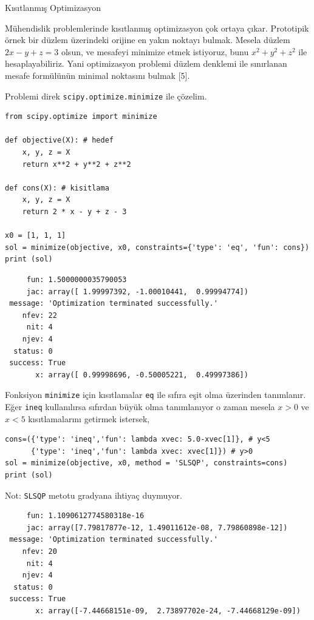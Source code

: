 \documentclass[12pt,fleqn]{article}\usepackage{../../common}
\begin{document}
Kısıtlanmış Optimizasyon

Mühendislik problemlerinde kısıtlanmış optimizasyon çok ortaya
çıkar. Prototipik örnek bir düzlem üzerindeki orijine en yakın noktayı
bulmak. Mesela düzlem $2x - y + z = 3$ olsun, ve mesafeyi minimize etmek
istiyoruz, bunu $x^2+y^2+z^2$ ile hesaplayabiliriz. Yani optimizasyon
problemi düzlem denklemi ile sınırlanan mesafe formülünün minimal noktasını
bulmak [5]. 

Problemi direk \verb!scipy.optimize.minimize! ile çözelim. 

\begin{verbatim}
from scipy.optimize import minimize

def objective(X): # hedef
    x, y, z = X
    return x**2 + y**2 + z**2

def cons(X): # kisitlama
    x, y, z = X
    return 2 * x - y + z - 3

x0 = [1, 1, 1]
sol = minimize(objective, x0, constraints={'type': 'eq', 'fun': cons})
print (sol)
\end{verbatim}

\begin{verbatim}
     fun: 1.5000000035790053
     jac: array([ 1.99997392, -1.00010441,  0.99994774])
 message: 'Optimization terminated successfully.'
    nfev: 22
     nit: 4
    njev: 4
  status: 0
 success: True
       x: array([ 0.99998696, -0.50005221,  0.49997386])
\end{verbatim}

Fonksiyon \verb!minimize! için kısıtlamalar \verb!eq! ile sıfıra eşit olma
üzerinden tanımlanır. Eğer \verb!ineq! kullanılırsa sıfırdan büyük olma
tanımlanıyor o zaman mesela $x>0$ ve $x<5$ kısıtlamalarını getirmek
istersek, 

\begin{verbatim}
cons=({'type': 'ineq','fun': lambda xvec: 5.0-xvec[1]}, # y<5
      {'type': 'ineq','fun': lambda xvec: xvec[1]}) # y>0
sol = minimize(objective, x0, method = 'SLSQP', constraints=cons)
print (sol)
\end{verbatim}

Not: \verb!SLSQP! metotu gradyana ihtiyaç duymuyor. 

\begin{verbatim}
     fun: 1.1090612774580318e-16
     jac: array([7.79817877e-12, 1.49011612e-08, 7.79860898e-12])
 message: 'Optimization terminated successfully.'
    nfev: 20
     nit: 4
    njev: 4
  status: 0
 success: True
       x: array([-7.44668151e-09,  2.73897702e-24, -7.44668129e-09])
\end{verbatim}
\end{document}
